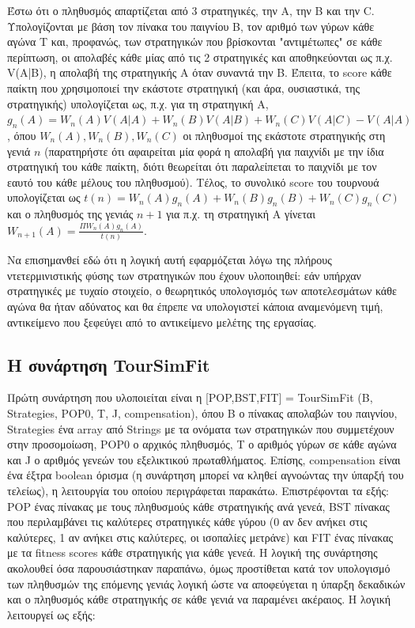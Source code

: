 \documentclass[12pt]{article}
\begin{document}
Έστω ότι ο πληθυσμός απαρτίζεται από 3 στρατηγικές, την A, την B και την C. Υπολογίζονται με βάση τον πίνακα του παιγνίου B, τον αριθμό των γύρων κάθε αγώνα T και, προφανώς, των στρατηγικών που βρίσκονται "αντιμέτωπες" σε κάθε περίπτωση, οι απολαβές κάθε μίας από τις 2 στρατηγικές και αποθηκεύονται ως π.χ. V(A|B), η απολαβή της στρατηγικής A όταν συναντά την B. Έπειτα, το score κάθε παίκτη που χρησιμοποιεί την εκάστοτε στρατηγική (και άρα, ουσιαστικά, της στρατηγικής) υπολογίζεται ως, π.χ. για τη στρατηγική A, $g_n(A) = W_n(A)V(A|A) + W_n(B)V(A|B) + W_n(C)V(A|C) − V(A|A)$ , όπου $W_n(A), W_n(B), W_n(C)$ οι πληθυσμοί της εκάστοτε στρατηγικής στη γενιά $n$ (παρατηρήστε ότι αφαιρείται μία φορά η απολαβή για παιχνίδι με την ίδια στρατηγική του κάθε παίκτη, διότι θεωρείται ότι παραλείπεται το παιχνίδι με τον εαυτό του κάθε μέλους του πληθυσμού). Τέλος, το συνολικό score του τουρνουά υπολογίζεται ως $t(n) = W_n(A)g_n(A) + W_n(B)g_n(B) + W_n(C)g_n(C)$ και ο πληθυσμός της γενιάς $n+1$ για π.χ. τη στρατηγική A γίνεται $W_{n+1}(A) = \frac{\Pi W_n(A)g_n(A)}{t(n)}$. 

Να επισημανθεί εδώ ότι η λογική αυτή εφαρμόζεται λόγω της πλήρους ντετερμινιστικής φύσης των στρατηγικών που έχουν υλοποιηθεί: εάν υπήρχαν στρατηγικές με τυχαίο στοιχείο, ο θεωρητικός υπολογισμός των αποτελεσμάτων κάθε αγώνα θα ήταν αδύνατος και θα έπρεπε να υπολογιστεί κάποια αναμενόμενη τιμή, αντικείμενο που ξεφεύγει από το αντικείμενο μελέτης της εργασίας.
\subsection{Η συνάρτηση TourSimFit}
Πρώτη συνάρτηση που υλοποιείται είναι η [POP,BST,FIT]\- =\- TourSimFit\- (B,\- Strategies,\- POP0,\- T, \-J,\- compensation), όπου B ο πίνακας απολαβών του παιγνίου, Strategies ένα array από Strings με τα ονόματα των στρατηγικών που συμμετέχουν στην προσομοίωση, POP0 ο αρχικός πληθυσμός, T ο αριθμός γύρων σε κάθε αγώνα και J ο αριθμός γενεών του εξελικτικού πρωταθλήματος. Επίσης, compensation είναι ένα έξτρα boolean όρισμα (η συνάρτηση μπορεί να κληθεί αγνοώντας την ύπαρξή του τελείως), η λειτουργία του οποίου περιγράφεται παρακάτω. Επιστρέφονται τα εξής: POP ένας πίνακας με τους πληθυσμούς κάθε στρατηγικής ανά γενεά, BST πίνακας που περιλαμβάνει τις καλύτερες στρατηγικές κάθε γύρου (0 αν δεν ανήκει στις καλύτερες, 1 αν ανήκει στις καλύτερες, οι ισοπαλίες μετράνε) και FIT ένας πίνακας με τα fitness scores κάθε στρατηγικής για κάθε γενεά. Η λογική της συνάρτησης ακολουθεί όσα παρουσιάστηκαν παραπάνω, όμως προστίθεται κατά τον υπολογισμό των πληθυσμών της επόμενης γενιάς λογική ώστε να αποφεύγεται η ύπαρξη δεκαδικών και ο πληθυσμός κάθε στρατηγικής σε κάθε γενιά να παραμένει ακέραιος. Η λογική λειτουργεί ως εξής:
\end{document}
